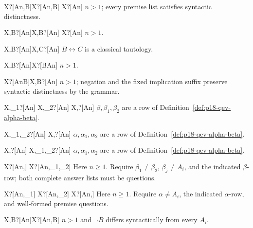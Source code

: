   {X\vdash ?[A\mid n,B]\qquad X\vdash ?[A\mid n,\neg B]}
  {X\vdash ?[A\mid n]}
  {\(n>1\); every premise list satisfies syntactic distinctness.}

  {X,B\vdash ?[A\mid n]\qquad X,\neg B\vdash ?[A\mid n]}
  {X\vdash ?[A\mid n]}
  {\(n>1\).}

  {X,B\vdash ?[A\mid n]}{X,C\vdash ?[A\mid n]}
  {\(B\leftrightarrow C\) is a classical tautology.}

  {X,B\vdash ?[A\mid n]}{X\vdash ?[B\to A\mid n]}
  {\(n>1\).}

  {X\vdash ?[A\mid n\to B]}{X,\neg B\vdash ?[\neg A\mid n]}
  {\(n>1\); negation and the fixed implication suffix preserve
   syntactic distinctness by the grammar.}

  {X,\beta_1\vdash ?[A\mid n]\qquad
   X,\beta_2\vdash ?[A\mid n]}
  {X,\beta\vdash ?[A\mid n]}
  {\(\beta,\beta_1,\beta_2\) are a row of
   Definition~\ref{def:p18-qev-alpha-beta}.}

  {X,\alpha_1,\alpha_2\vdash ?[A\mid n]}
  {X,\alpha\vdash ?[A\mid n]}
  {\(\alpha,\alpha_1,\alpha_2\) are a row of
   Definition~\ref{def:p18-qev-alpha-beta}.}

  {X,\alpha\vdash ?[A\mid n]}
  {X,\alpha_1,\alpha_2\vdash ?[A\mid n]}
  {\(\alpha,\alpha_1,\alpha_2\) are a row of
   Definition~\ref{def:p18-qev-alpha-beta}.}

  {X\vdash ?[A\mid n,\beta]}
  {X\vdash ?[A\mid n,\beta_1,\beta_2]}
  {Here \(n\geq1\). Require \(\beta_1\ne\beta_2\),
   \(\beta_j\ne A_i\), and the indicated \(\beta\)-row;
   both complete answer lists must be questions.}

  {X\vdash ?[A\mid n,\alpha_1]\qquad
   X\vdash ?[A\mid n,\alpha_2]}
  {X\vdash ?[A\mid n,\alpha]}
  {Here \(n\geq1\). Require \(\alpha\ne A_i\), the
   indicated \(\alpha\)-row, and well-formed premise questions.}

  {X,B\vdash ?[A\mid n]}{X\vdash ?[A\mid n,\neg B]}
  {\(n>1\) and \(\neg B\) differs syntactically from every \(A_i\).}
